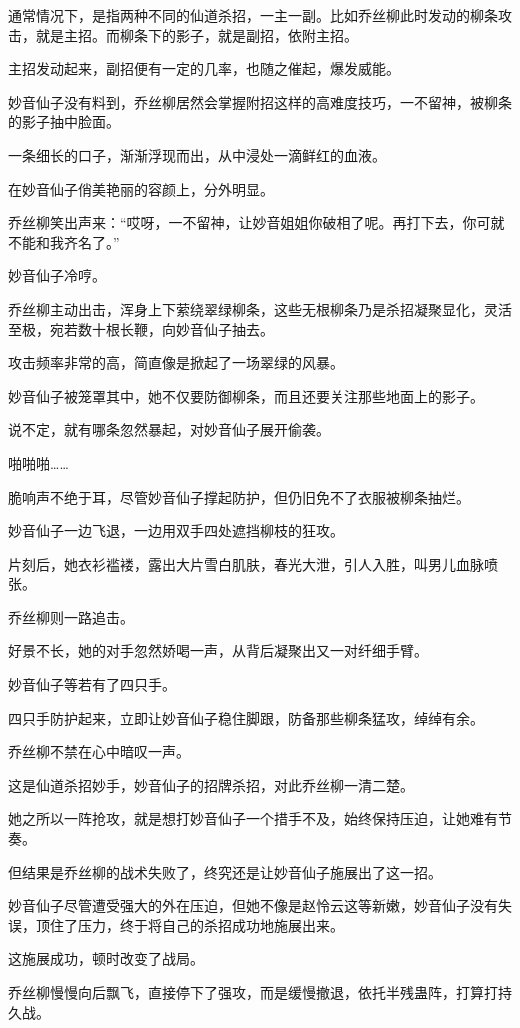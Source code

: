 \begin{this_body}
通常情况下，是指两种不同的仙道杀招，一主一副。比如乔丝柳此时发动的柳条攻击，就是主招。而柳条下的影子，就是副招，依附主招。

主招发动起来，副招便有一定的几率，也随之催起，爆发威能。

妙音仙子没有料到，乔丝柳居然会掌握附招这样的高难度技巧，一不留神，被柳条的影子抽中脸面。

一条细长的口子，渐渐浮现而出，从中浸处一滴鲜红的血液。

在妙音仙子俏美艳丽的容颜上，分外明显。

乔丝柳笑出声来：“哎呀，一不留神，让妙音姐姐你破相了呢。再打下去，你可就不能和我齐名了。”

妙音仙子冷哼。

乔丝柳主动出击，浑身上下萦绕翠绿柳条，这些无根柳条乃是杀招凝聚显化，灵活至极，宛若数十根长鞭，向妙音仙子抽去。

攻击频率非常的高，简直像是掀起了一场翠绿的风暴。

妙音仙子被笼罩其中，她不仅要防御柳条，而且还要关注那些地面上的影子。

说不定，就有哪条忽然暴起，对妙音仙子展开偷袭。

啪啪啪……

脆响声不绝于耳，尽管妙音仙子撑起防护，但仍旧免不了衣服被柳条抽烂。

妙音仙子一边飞退，一边用双手四处遮挡柳枝的狂攻。

片刻后，她衣衫褴褛，露出大片雪白肌肤，春光大泄，引人入胜，叫男儿血脉喷张。

乔丝柳则一路追击。

好景不长，她的对手忽然娇喝一声，从背后凝聚出又一对纤细手臂。

妙音仙子等若有了四只手。

四只手防护起来，立即让妙音仙子稳住脚跟，防备那些柳条猛攻，绰绰有余。

乔丝柳不禁在心中暗叹一声。

这是仙道杀招妙手，妙音仙子的招牌杀招，对此乔丝柳一清二楚。

她之所以一阵抢攻，就是想打妙音仙子一个措手不及，始终保持压迫，让她难有节奏。

但结果是乔丝柳的战术失败了，终究还是让妙音仙子施展出了这一招。

妙音仙子尽管遭受强大的外在压迫，但她不像是赵怜云这等新嫩，妙音仙子没有失误，顶住了压力，终于将自己的杀招成功地施展出来。

这施展成功，顿时改变了战局。

乔丝柳慢慢向后飘飞，直接停下了强攻，而是缓慢撤退，依托半残蛊阵，打算打持久战。


\end{this_body}
